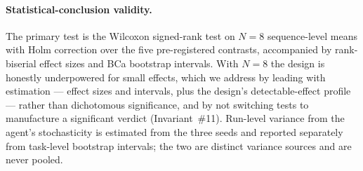 \paragraph{Statistical-conclusion validity.}
The primary test is the Wilcoxon signed-rank test on $N=8$ sequence-level means with Holm
correction over the five pre-registered contrasts, accompanied by rank-biserial effect sizes
and BCa bootstrap intervals. With $N=8$ the design is honestly underpowered for small
effects, which we address by leading with estimation --- effect sizes and intervals, plus the
design's detectable-effect profile --- rather than dichotomous significance, and by not
switching tests to manufacture a significant verdict (Invariant~\#11). Run-level variance
from the agent's stochasticity is estimated from the three seeds and reported separately from
task-level bootstrap intervals; the two are distinct variance sources and are never pooled.
